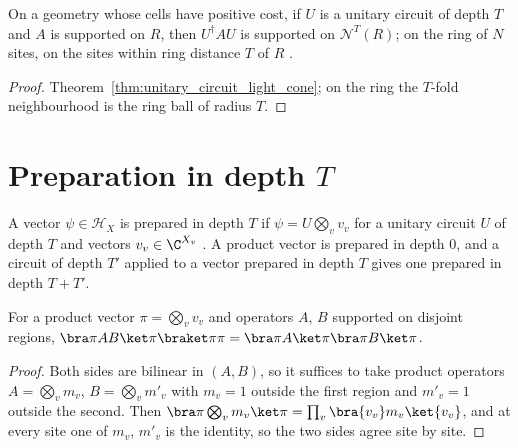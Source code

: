 \begin{theorem}
    \label{thm:unitary_classes_light_cone}
    \leanok
    On a geometry whose cells have positive cost, if $U$ is a unitary circuit of depth
    $T$ and $A$ is supported on $R$, then $U^\dagger AU$ is supported on
    $\mathcal N^T(R)$; on the ring of $N$ sites, on the sites within ring distance $T$
    of $R$ \cite[Theorem~1]{Malz2024Preparation}.
\end{theorem}
\begin{proof}\leanok
    Theorem~\ref{thm:unitary_circuit_light_cone}; on the ring the $T$-fold
    neighbourhood is the ring ball of radius $T$.
\end{proof}

\section{Preparation in depth $T$}
\label{sec:unitary_preparation}

\begin{definition}
    \label{def:unitary_prepared}
    \leanok
    A vector $\psi\in\mathcal H_X$ is prepared in depth $T$ if $\psi=U\bigotimes_v v_v$
    for a unitary circuit $U$ of depth $T$ and vectors $v_v\in\C^{X_v}$
    \cite{Malz2024Preparation}. A product vector is prepared in depth $0$, and a
    circuit of depth $T'$ applied to a vector prepared in depth $T$ gives one prepared
    in depth $T+T'$.
\end{definition}

\begin{lemma}
    \label{lem:unitary_product_vector}
    \leanok
    For a product vector $\pi=\bigotimes_vv_v$ and operators $A$, $B$ supported on
    disjoint regions,
    $\bra\pi AB\ket\pi\braket\pi\pi=\bra\pi A\ket\pi\bra\pi B\ket\pi$.
\end{lemma}
\begin{proof}\leanok
    Both sides are bilinear in $(A,B)$, so it suffices to take product operators
    $A=\bigotimes_vm_v$, $B=\bigotimes_vm'_v$ with $m_v=1$ outside the first region and
    $m'_v=1$ outside the second. Then $\bra\pi\bigotimes_vm_v\ket\pi=
        \prod_v\bra{v_v}m_v\ket{v_v}$, and at every site one of $m_v$, $m'_v$ is the identity,
    so the two sides agree site by site.
\end{proof}

